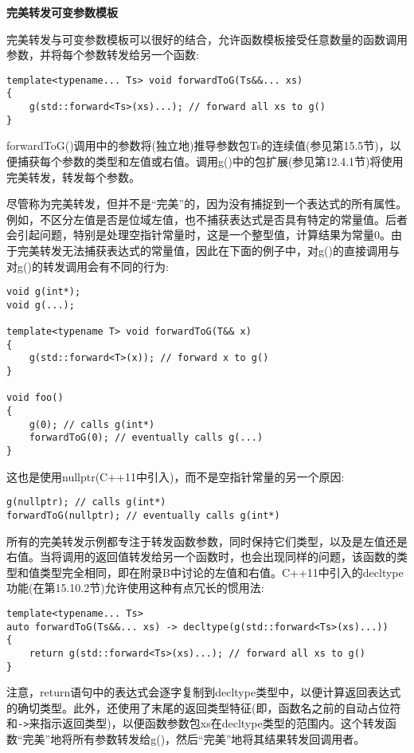 \noindent
\textbf{完美转发可变参数模板}

完美转发与可变参数模板可以很好的结合，允许函数模板接受任意数量的函数调用参数，并将每个参数转发给另一个函数:

\begin{lstlisting}[style=styleCXX]
template<typename... Ts> void forwardToG(Ts&&... xs)
{
	g(std::forward<Ts>(xs)...); // forward all xs to g()
}
\end{lstlisting}

forwardToG()调用中的参数将(独立地)推导参数包Ts的连续值(参见第15.5节)，以便捕获每个参数的类型和左值或右值。调用g()中的包扩展(参见第12.4.1节)将使用完美转发，转发每个参数。

尽管称为完美转发，但并不是“完美”的，因为没有捕捉到一个表达式的所有属性。例如，不区分左值是否是位域左值，也不捕获表达式是否具有特定的常量值。后者会引起问题，特别是处理空指针常量时，这是一个整型值，计算结果为常量0。由于完美转发无法捕获表达式的常量值，因此在下面的例子中，对g()的直接调用与对g()的转发调用会有不同的行为:

\begin{lstlisting}[style=styleCXX]
void g(int*);
void g(...);

template<typename T> void forwardToG(T&& x)
{
	g(std::forward<T>(x)); // forward x to g()
}

void foo()
{
	g(0); // calls g(int*)
	forwardToG(0); // eventually calls g(...)
}
\end{lstlisting}

这也是使用nullptr(C++11中引入)，而不是空指针常量的另一个原因:

\begin{lstlisting}[style=styleCXX]
g(nullptr); // calls g(int*)
forwardToG(nullptr); // eventually calls g(int*)
\end{lstlisting}

所有的完美转发示例都专注于转发函数参数，同时保持它们类型，以及是左值还是右值。当将调用的返回值转发给另一个函数时，也会出现同样的问题，该函数的类型和值类型完全相同，即在附录B中讨论的左值和右值。C++11中引入的decltype功能(在第15.10.2节)允许使用这种有点冗长的惯用法:

\begin{lstlisting}[style=styleCXX]
template<typename... Ts>
auto forwardToG(Ts&&... xs) -> decltype(g(std::forward<Ts>(xs)...))
{
	return g(std::forward<Ts>(xs)...); // forward all xs to g()
}
\end{lstlisting}

注意，return语句中的表达式会逐字复制到decltype类型中，以便计算返回表达式的确切类型。此外，还使用了末尾的返回类型特征(即，函数名之前的自动占位符和\texttt{->}来指示返回类型)，以便函数参数包xs在decltype类型的范围内。这个转发函数“完美”地将所有参数转发给g()，然后“完美”地将其结果转发回调用者。

